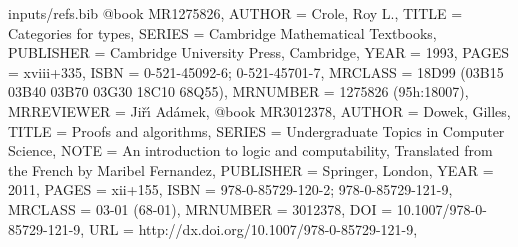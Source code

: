 \begin{filecontents*}{inputs/refs.bib}
@book {MR1275826,
    AUTHOR = {Crole, Roy L.},
     TITLE = {Categories for types},
    SERIES = {Cambridge Mathematical Textbooks},
 PUBLISHER = {Cambridge University Press, Cambridge},
      YEAR = {1993},
     PAGES = {xviii+335},
      ISBN = {0-521-45092-6; 0-521-45701-7},
   MRCLASS = {18D99 (03B15 03B40 03B70 03G30 18C10 68Q55)},
  MRNUMBER = {1275826 (95h:18007)},
MRREVIEWER = {Ji{\v{r}}{\'{\i}} Ad{\'a}mek},
}
@book {MR3012378,
  AUTHOR = {Dowek, Gilles},
  TITLE = {Proofs and algorithms},
  SERIES = {Undergraduate Topics in Computer Science},
  NOTE = {An introduction to logic and computability,
    Translated from the French by Maribel Fernandez},
  PUBLISHER = {Springer, London},
  YEAR = {2011},
  PAGES = {xii+155},
  ISBN = {978-0-85729-120-2; 978-0-85729-121-9},
  MRCLASS = {03-01 (68-01)},
  MRNUMBER = {3012378},
  DOI = {10.1007/978-0-85729-121-9},
  URL = {http://dx.doi.org/10.1007/978-0-85729-121-9},
}
\end{filecontents*}
\documentclass[11pt]{amsart}


\usepackage{amsmath}
\usepackage{amscd,amssymb,amsthm} %
\usepackage{latexsym,stmaryrd,mathrsfs,enumerate,scalefnt,ifthen}
\usepackage{mathtools}
\usepackage[mathcal]{euscript}
\usepackage[colorlinks=true,urlcolor=black,linkcolor=black,citecolor=black]{hyperref}
\usepackage{url}
\usepackage{scalefnt}
\usepackage{tikz}
\usepackage{color}
\usepackage[margin=1in]{geometry}
\usepackage{scrextend}

\theoremstyle{plain}
\newtheorem{theorem}{Theorem}[section]
\newtheorem{lemma}[theorem]{Lemma}
\newtheorem{proposition}[theorem]{Proposition}
\newtheorem{prop}[theorem]{Proposition}
\theoremstyle{definition}
\newtheorem{claim}[theorem]{Claim}
\newtheorem{corollary}[theorem]{Corollary}
\newtheorem{definition}[theorem]{Definition}
\newtheorem{notation}[theorem]{Notation}
\newtheorem{Fact}[theorem]{Fact}
\newtheorem*{fact}{Fact}
\newtheorem{example}[theorem]{Example}
\newtheorem{examples}[theorem]{Examples}
\newtheorem{exercise}{Exercise}
\newtheorem*{lem}{Lemma}
\newtheorem*{cor}{Corollary}
\newtheorem*{remark}{Remark}
\newtheorem*{remarks}{Remarks}
\newtheorem*{obs}{Observation}


